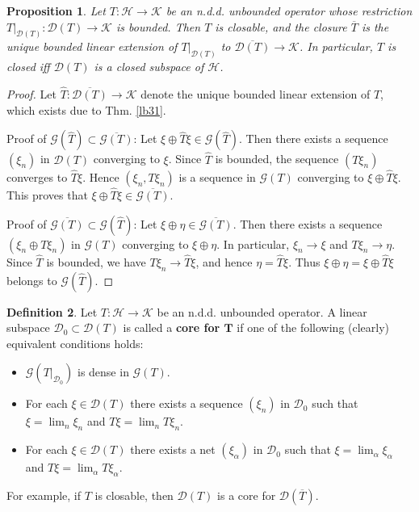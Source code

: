 \documentclass[12pt,b5paper,notitlepage]{article}
\theoremstyle{definition}
\newtheorem{df}{Definition}[subsection]
\theoremstyle{plain}
\newtheorem{pp}[df]{Proposition}
\newcommand{\wht}{\widehat}
\newcommand{\ovl}{\overline}
\newcommand{\Dom}{\mathscr{D}}
\newcommand{\MH}{\mathcal H}
\newcommand{\MK}{\mathcal K}
\newcommand{\SG}{\mathscr G}
\numberwithin{equation}{section}
\begin{document}
\begin{pp}\label{lb388}
Let $T:\MH\rightarrow\MK$ be an n.d.d. unbounded operator whose restriction $T|_{\Dom(T)}:\Dom(T)\rightarrow\MK$ is bounded. Then $T$ is closable, and the closure $\ovl T$ is the unique bounded linear extension of $T|_{\Dom(T)}$ to $\ovl{\Dom(T)}\rightarrow\MK$. In particular, $T$ is closed iff $\Dom(T)$ is a closed subspace of $\MH$.
\end{pp}

\begin{proof}
Let $\wht T:\ovl{\Dom(T)}\rightarrow\MK$ denote the unique bounded linear extension of $T$, which exists due to Thm. \ref{lb31}. 

Proof of $\SG(\wht T)\subset\ovl{\SG(T)}$: Let $\xi\oplus \wht T\xi\in\SG(\wht T)$. Then there exists a sequence $(\xi_n)$ in $\Dom(T)$ converging to $\xi$. Since $\wht T$ is bounded, the sequence $(T\xi_n)$ converges to $\wht T\xi$. Hence $(\xi_n,T\xi_n)$ is a sequence in $\SG(T)$ converging to $\xi\oplus \wht T\xi$. This proves that $\xi\oplus \wht T\xi\in\ovl{\SG(T)}$.

Proof of $\ovl{\SG(T)}\subset\SG(\wht T)$: Let $\xi\oplus\eta\in\ovl{\SG(T)}$. Then there exists a sequence $(\xi_n\oplus T\xi_n)$ in $\SG(T)$ converging to $\xi\oplus\eta$. In particular, $\xi_n\rightarrow \xi$ and $T\xi_n\rightarrow \eta$. Since $\wht T$ is bounded, we have $T\xi_n\rightarrow\wht T\xi$, and hence $\eta=\wht T\xi$. Thus $\xi\oplus\eta=\xi\oplus\wht T\xi$ belongs to $\SG(\wht T)$.
\end{proof}



\begin{df}\label{lb386}
Let $T:\MH\rightarrow\MK$ be an n.d.d. unbounded operator. A linear subspace $\Dom_0\subset\Dom(T)$ is called a \textbf{core for $\pmb T$}  if one of the following (clearly) equivalent conditions holds: 
\begin{itemize}
\item $\SG(T|_{\Dom_0})$ is dense in $\SG(T)$.
\item For each $\xi\in\Dom(T)$ there exists a sequence $(\xi_n)$ in $\Dom_0$ such that $\xi=\lim_n\xi_n$ and $T\xi=\lim_n T\xi_n$.
\item For each $\xi\in\Dom(T)$ there exists a net $(\xi_\alpha)$ in $\Dom_0$ such that $\xi=\lim_\alpha\xi_\alpha$ and $T\xi=\lim_\alpha T\xi_\alpha$.
\end{itemize}
For example, if $T$ is closable, then $\Dom(T)$ is a core for $\Dom(\ovl T)$.
\end{df}
\end{document}

